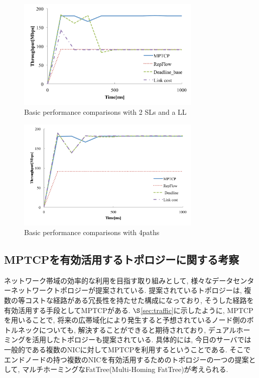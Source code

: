 \begin{figure}[t]
    \begin{center}
    \includegraphics[autoebb, width=250pt]{./img/sl2_ll1.pdf}
    \caption{Basic performance comparisons with 2 SLs and a LL}
    \label{fig:basic_comparison_sl2_ll1}
    \end{center}
\end{figure}

\begin{figure}[t]
    \begin{center}
    \includegraphics[autoebb, width=250pt]{./img/4path.pdf}
    \caption{Basic performance comparisons with 4paths}
    \label{fig:basic_comparison_4path}
    \end{center}
\end{figure}

\subsection{MPTCPを有効活用するトポロジーに関する考察}

ネットワーク帯域の効率的な利用を目指す取り組みとして, 様々なデータセンターネットワークトポロジーが提案されている. 
提案されているトポロジーは, 複数の等コストな経路がある冗長性を持たせた構成になっており, そうした経路を有効活用する手段としてMPTCPがある. 
$\S$\ref{sec:traffic}に示したように, MPTCPを用いることで,
将来の広帯域化により発生すると予想されているノード側のボトルネックについても, 解決することができると期待されており,
デュアルホーミングを活用したトポロジーも提案されている\cite{improving}. 
具体的には, 今日のサーバでは一般的である複数のNICに対してMPTCPを利用するということである. 
そこでエンドノードの持つ複数のNICを有効活用するためのトポロジーの一つの提案として, マルチホーミングなFatTree(Multi-Homing
FatTree)が考えられる.  

